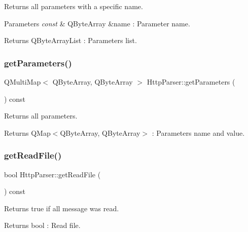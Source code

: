 Returns all parameters with a specific name. 


\begin{DoxyParams}{Parameters}
{\em const} & Q\+Byte\+Array \&name \+: Parameter name. \\
\hline
\end{DoxyParams}
\begin{DoxyReturn}{Returns}
Q\+Byte\+Array\+List \+: Parameters list. 
\end{DoxyReturn}
\mbox{\label{class_http_parser_ad71aba18e720a76588c1fed96c812f31}} 
\subsubsection{\texorpdfstring{get\+Parameters()}{getParameters()}\hspace{0.1cm}{\footnotesize\ttfamily [2/2]}}
{\footnotesize\ttfamily Q\+Multi\+Map$<$ Q\+Byte\+Array, Q\+Byte\+Array $>$ Http\+Parser\+::get\+Parameters (\begin{DoxyParamCaption}{ }\end{DoxyParamCaption}) const}



Returns all parameters. 

\begin{DoxyReturn}{Returns}
Q\+Map$<$\+Q\+Byte\+Array, Q\+Byte\+Array$>$ \+: Parameters name and value. 
\end{DoxyReturn}
\mbox{\label{class_http_parser_aba65276efdd7ccfd93ff03f29f80889f}} 
\subsubsection{\texorpdfstring{get\+Read\+File()}{getReadFile()}}
{\footnotesize\ttfamily bool Http\+Parser\+::get\+Read\+File (\begin{DoxyParamCaption}{ }\end{DoxyParamCaption}) const}



Returns true if all message was read. 

\begin{DoxyReturn}{Returns}
bool \+: Read file. 
\end{DoxyReturn}
\mbox{\label{class_http_parser_a60292a9b49d1e86becec848c3d0541bc}} 

